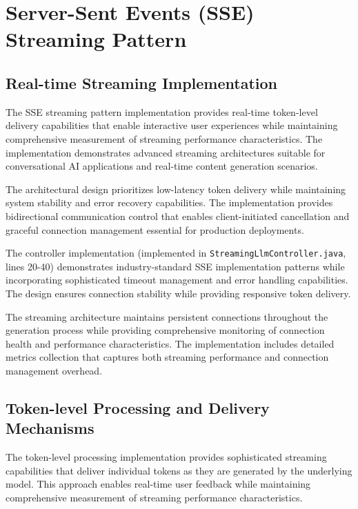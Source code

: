 

\section{Server-Sent Events (SSE) Streaming Pattern}

\subsection{Real-time Streaming Implementation}

The SSE streaming pattern implementation provides real-time token-level delivery capabilities that enable interactive user experiences while maintaining comprehensive measurement of streaming performance characteristics. The implementation demonstrates advanced streaming architectures suitable for conversational AI applications and real-time content generation scenarios.

The architectural design prioritizes low-latency token delivery while maintaining system stability and error recovery capabilities. The implementation provides bidirectional communication control that enables client-initiated cancellation and graceful connection management essential for production deployments.

The controller implementation (implemented in \texttt{StreamingLlmController.java}, lines 20-40) demonstrates industry-standard SSE implementation patterns while incorporating sophisticated timeout management and error handling capabilities. The design ensures connection stability while providing responsive token delivery.


The streaming architecture maintains persistent connections throughout the generation process while providing comprehensive monitoring of connection health and performance characteristics. The implementation includes detailed metrics collection that captures both streaming performance and connection management overhead.

\subsection{Token-level Processing and Delivery Mechanisms}

The token-level processing implementation provides sophisticated streaming capabilities that deliver individual tokens as they are generated by the underlying model. This approach enables real-time user feedback while maintaining comprehensive measurement of streaming performance characteristics.


